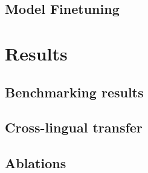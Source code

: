 \documentclass[11pt]{article}
\begin{document}
\subsection{Model Finetuning}


\section{Results}


\subsection{Benchmarking results}


\subsection{Cross-lingual transfer}


\subsection{Ablations}





\end{document}
